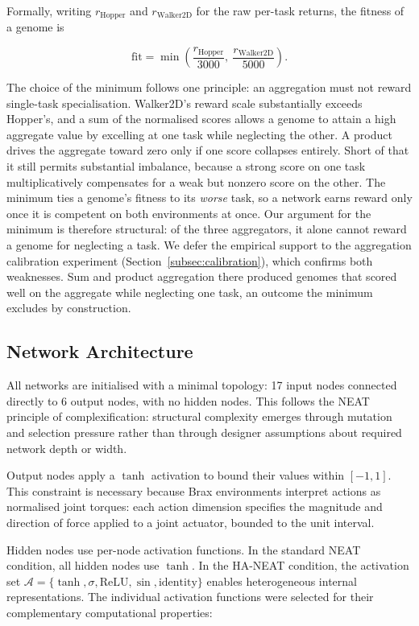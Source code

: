\documentclass[12pt]{article}
\newcommand{\revBrit}[2]{#2}
\newcommand{\revTerm}[2]{#2}
\begin{document}
Formally, writing $r_{\text{Hopper}}$ and $r_{\text{Walker2D}}$ for the raw per-task returns, the fitness of a genome is

\[\text{fit} = \min\!\left(\frac{r_{\text{Hopper}}}{3000},\ \frac{r_{\text{Walker2D}}}{5000}\right).\]

The choice of the minimum follows one principle: an aggregation must not reward \revBrit{E-07}{single-task specialisation}.
Walker2D's reward scale substantially exceeds Hopper's, and a sum of the normalised scores allows a genome to attain a high aggregate value by excelling at one task while neglecting the other.
A product drives the aggregate toward zero only if one score collapses entirely. Short of that it still permits substantial imbalance, because a strong score on one task multiplicatively compensates for a weak but nonzero score on the other.
The minimum ties a genome's fitness to its \emph{worse} task, so a network earns reward only once it is competent on both environments at once.
Our argument for the minimum is therefore structural: of the three aggregators, it alone cannot reward a genome for neglecting a task.
We defer the empirical support to the aggregation calibration experiment (Section~\ref{subsec:calibration}), which confirms both weaknesses. Sum and product aggregation there produced genomes that scored well on the aggregate while neglecting one task, an outcome the minimum excludes by construction.

\subsection{Network Architecture}
\label{subsec:network-architecture}

All networks are initialised with a minimal topology: 17 input nodes connected directly to 6 output nodes, with no hidden nodes.
This follows the NEAT principle of complexification: structural complexity emerges through mutation and selection pressure rather than through designer assumptions about required network depth or width.

Output nodes apply a $\tanh$ activation to bound their values within $[-1, 1]$.
This constraint is necessary because Brax environments interpret actions as normalised joint torques: each action dimension specifies the magnitude and direction of force applied to a joint actuator, bounded to the unit interval.

Hidden nodes use per-node activation functions.
In the standard NEAT condition, all hidden nodes use $\tanh$.
In the HA-NEAT condition, \revTerm{T-07}{the activation set} $\mathcal{A} = \{\tanh, \sigma, \text{ReLU}, \sin, \text{identity}\}$ enables heterogeneous internal representations.
The individual activation functions were selected for their complementary computational properties:
\end{document}
